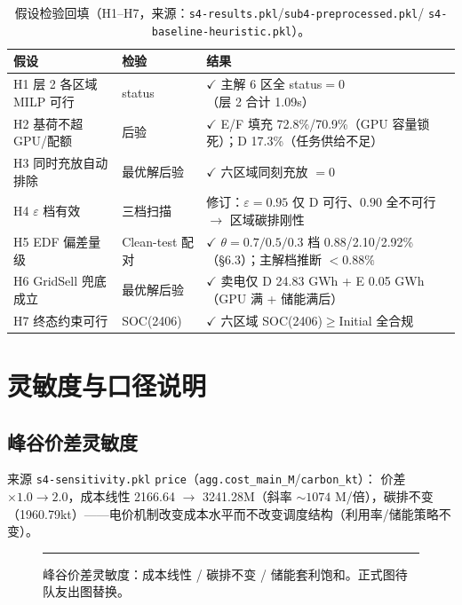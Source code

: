 \documentclass{internal-report}
\begin{document}
\begin{table}[H]
\centering
\footnotesize
\begin{tabular}{lll}
\toprule
假设 & 检验 & 结果 \\
\midrule
H1 层 2 各区域 MILP 可行 & status & $\checkmark$ 主解 6 区全 status$=0$（层 2 合计 1.09s） \\
H2 基荷不超 GPU/配额 & 后验 & $\checkmark$ E/F 填充 72.8\%/70.9\%（GPU 容量锁死）；D 17.3\%（任务供给不足） \\
H3 同时充放自动排除 & 最优解后验 & $\checkmark$ 六区域同刻充放 $=0$ \\
H4 $\varepsilon$ 档有效 & 三档扫描 & 修订：$\varepsilon{=}0.95$ 仅 D 可行、$0.90$ 全不可行 $\to$ 区域碳排刚性 \\
H5 EDF 偏差量级 & Clean-test 配对 & $\checkmark$ $\theta{=}0.7/0.5/0.3$ 档 0.88/2.10/2.92\%（§6.3）；主解档推断 $<0.88\%$ \\
H6 GridSell 兜底成立 & 最优解后验 & $\checkmark$ 卖电仅 D 24.83 GWh + E 0.05 GWh（GPU 满 + 储能满后） \\
H7 终态约束可行 & SOC(2406) & $\checkmark$ 六区域 SOC(2406)$\ge$Initial 全合规 \\
\bottomrule
\end{tabular}
\caption{假设检验回填（H1--H7，来源：\texttt{s4-results.pkl}/\texttt{sub4-preprocessed.pkl}/
\texttt{s4-baseline-heuristic.pkl}）。}
\label{tab:h}
\end{table}

\section{灵敏度与口径说明}
\label{sec:sens}

\subsection{峰谷价差灵敏度}
\label{sec:sens-price}

来源 \texttt{s4-sensitivity.pkl} \texttt{price}（\texttt{agg.cost\_main\_M}/\texttt{carbon\_kt}）：
价差 $\times 1.0 \to 2.0$，成本线性 2166.64 $\to$ 3241.28M（斜率 $\sim 1074$ M/倍），碳排不变
（1960.79kt）——电价机制改变成本水平而不改变调度结构（利用率/储能策略不变）。

\begin{figure}[H]
\centering
\rule{0.9\textwidth}{4cm}
\caption{峰谷价差灵敏度：成本线性 / 碳排不变 / 储能套利饱和。正式图待队友出图替换。}
\label{fig:sensp}
\end{figure}
\end{document}
